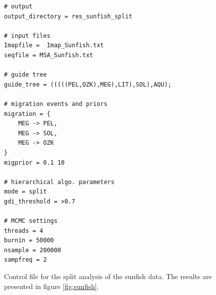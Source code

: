 \documentclass{article1}
\begin{document}
\begin{figure}[h]
\footnotesize
\begin{verbatim}
# output
output_directory = res_sunfish_split

# input files
Imapfile =  Imap_Sunfish.txt
seqfile = MSA_Sunfish.txt

# guide tree
guide_tree = (((((PEL,OZK),MEG),LIT),SOL),AQU);

# migration events and priors
migration = {
    MEG -> PEL,
    MEG -> SOL,
    MEG -> OZK
}
migprior = 0.1 10

# hierarchical algo. parameters
mode = split
gdi_threshold = >0.7

# MCMC settings
threads = 4
burnin = 50000
nsample = 200000
sampfreq = 2
\end{verbatim}

\caption{Control file for the split analysis of the sunfish data.  The results are
presented in figure \ref{fig:sunfish}. %
} \label{fig:sunfish_mcf_split}
\end{figure}


\onecolumn
\end{document}
